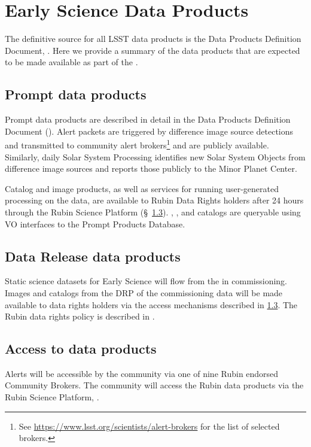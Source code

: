 \section{Early Science Data Products} 
\label{sec:data}

The definitive source for all LSST data products is the Data Products Definition Document, \citep{LSE-163}.
Here we provide a summary of the data products that are expected to be made available as part of the \esp. 

\subsection{Prompt data products}

Prompt data products are described in detail in the Data Products Definition Document (\DPDD).
Alert packets are triggered by difference image source detections and transmitted to community alert brokers\footnote{See \url{https://www.lsst.org/scientists/alert-brokers} for the list of selected brokers.} and are publicly available. 
Similarly, daily Solar System Processing identifies new Solar System Objects from difference image sources and reports those publicly to the Minor Planet Center.

Catalog and image products, as well as services for running user-generated processing on the data, are available to Rubin Data Rights holders after 24 hours through the Rubin Science Platform (\S~\ref{ssec:dataaccess}).
\DIASource, \DIAObject, and \SSObject catalogs are queryable using VO interfaces to the Prompt Products Database.

\subsection{Data Release data products}
Static science datasets for Early Science will flow from the \svs in commissioning.
Images and catalogs from the DRP of the commissioning data will be made available to data rights holders via the access mechanisms described in \ref{ssec:dataaccess}.
The Rubin data rights policy is described in  \cite{RDO-013}.


\subsection{Access to \es data products}\label{ssec:dataaccess}
Alerts will be accessible by the community via one of nine Rubin endorsed Community Brokers. 
The community will access the Rubin data products via the Rubin Science Platform, \citep{LSE-319}.


